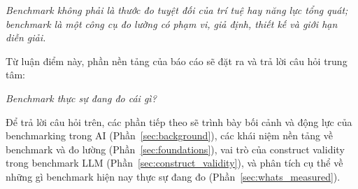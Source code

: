 \begin{summarybox}
\textit{Benchmark không phải là thước đo tuyệt đối của trí tuệ hay năng lực tổng quát; benchmark là một công cụ đo lường có phạm vi, giả định, thiết kế và giới hạn diễn giải.}
\end{summarybox}

Từ luận điểm này, phần nền tảng của báo cáo sẽ đặt ra và trả lời câu hỏi trung tâm:

\begin{summarybox}
\textit{Benchmark thực sự đang đo cái gì?}
\end{summarybox}

Để trả lời câu hỏi trên, các phần tiếp theo sẽ trình bày bối cảnh và động lực của benchmarking trong AI (Phần~\ref{sec:background}), các khái niệm nền tảng về benchmark và đo lường (Phần~\ref{sec:foundations}), vai trò của construct validity trong benchmark LLM (Phần~\ref{sec:construct_validity}), và phân tích cụ thể về những gì benchmark hiện nay thực sự đang đo (Phần~\ref{sec:whats_measured}).